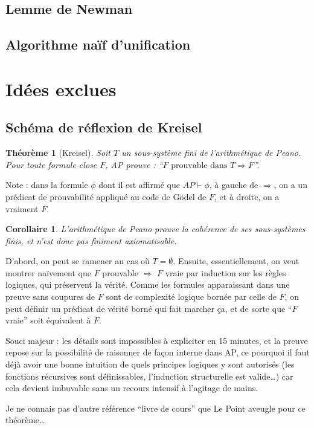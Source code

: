 \documentclass[a4paper, 11pt]{article}
\newtheorem*{theorem}{Théorème}
\newtheorem*{corollary}{Corollaire}
\begin{document}
\newpage

\subsection{Lemme de Newman}

\subsection{Algorithme naïf d'unification}



\newpage

\section{Idées exclues}

\subsection{Schéma de réflexion de Kreisel}

\begin{theorem}[Kreisel]
  Soit $T$ un sous-système fini de l'arithmétique de Peano. Pour toute formule
  close $F$, AP prouve : \enquote{$F \text{ prouvable dans } T \Rightarrow F$}.
\end{theorem}
Note : dans la formule $\phi$ dont il est affirmé que $AP \vdash \phi$, à gauche
de $\Rightarrow$, on a un prédicat de prouvabilité appliqué au code de Gödel de
$F$, et à droite, on a vraiment $F$.
\begin{corollary}
  L'arithmétique de Peano prouve la cohérence de ses sous-systèmes finis, et
  n'est donc pas finiment axiomatisable.
\end{corollary}

D'abord, on peut se ramener au cas où $T = \emptyset$. Ensuite, essentiellement,
on veut montrer naïvement que $F$ prouvable $\Rightarrow$ $F$ vraie par
induction sur les règles logiques, qui préservent la vérité. Comme les formules
apparaissant dans une preuve sans coupures de $F$ sont de complexité logique
bornée par celle de $F$, on peut définir un prédicat de vérité borné qui fait
marcher ça, et de sorte que \enquote{$F$ vraie} soit équivalent à $F$.

Souci majeur : les détails sont impossibles à expliciter en 15 minutes, et la
preuve repose sur la possibilité de raisonner de façon interne dans AP, ce
pourquoi il faut déjà avoir une bonne intuition de quels principes logiques y
sont autorisés (les fonctions récursives sont définissables, l'induction
structurelle est valide…) car cela devient imbuvable sans un recours intensif à
l'agitage de mains.

Je ne connais pas d'autre référence \enquote{livre de cours} que Le Point
aveugle pour ce théorème…
\end{document}
